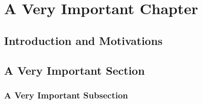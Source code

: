 \documentclass[debug]{phd}
\begin{document}
	\chapter{A Very Important Chapter}
	\label{chapbrane}
			
			\section{Introduction and Motivations}
			
			\section{A Very Important Section}
            	\subsection{A Very Important Subsection}
					
\end{document}
